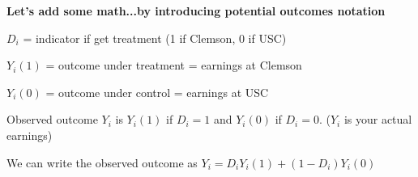 \documentclass[11pt, aspectratio=169]{beamer}
\newenvironment{wideitemize}{\itemize\addtolength{\itemsep}{5pt}}{\enditemize}
\begin{document}

\begin{frame}{\bf \large Let's add some math...by introducing \textbf{potential outcomes} notation}
\begin{wideitemize}
	
	\item $D_i$ = indicator if get treatment (1 if Clemson, 0 if USC)
	

	\item $Y_i(1)$ = outcome under treatment = earnings at Clemson
	\item $Y_i(0)$ = outcome under control = earnings at USC
	
\vspace{10mm}

	\item Observed outcome $Y_i$ is $Y_i(1)$ if $D_i = 1$ and $Y_i(0)$ if $D_i = 0$. ($Y_i$ is your actual earnings)
	
	\item
	We can write the observed outcome as $Y_i = D_i Y_i(1) + (1-D_i) Y_i(0)$
\end{wideitemize}

\end{frame}
\end{document}
